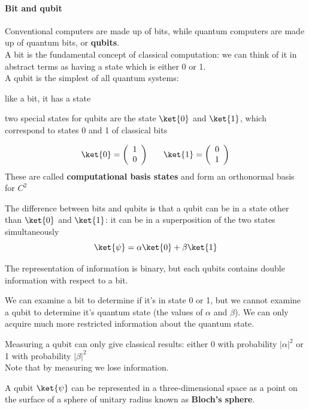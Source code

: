 \documentclass[10pt]{report}
\begin{document}
\paragraph{Bit and qubit} Conventional computers are made up of bits, while quantum computers are made up of quantum bits, or \textbf{qubits}.\\
A bit is the fundamental concept of classical computation: we can think of it in abstract terms as having a state which is either 0 or 1.\\
A qubit is the simplest of all quantum systems:
\begin{list}{}{}
	\item like a bit, it has a state
	\item two special states for qubits are the state $\ket{0}$ and $\ket{1}$, which correspond to states 0 and 1 of classical bits
	
$$\ket{0} = \left(\begin{array}{c}
	1\\0
	\end{array}\right)\:\:\:\:\:\:\:\:\ket{1} = \left(\begin{array}{c}
	0\\1
	\end{array}\right)$$
	These are called \textbf{computational basis states} and form an orthonormal basis for $C^2$
	\item The difference between bits and qubits is that a qubit can be in a state other than $\ket{0}$ and $\ket{1}$: it can be in a superposition of the two states simultaneously
	$$\ket{\psi} = \alpha\ket{0}+\beta\ket{1}$$
	\item The representation of information is binary, but each qubits contains double information with respect to a bit.
	\item We can examine a bit to determine if it's in state 0 or 1, but we cannot examine a qubit to determine it's quantum state (the values of $\alpha$ and $\beta$). We can only acquire much more restricted information about the quantum state.
	\item Measuring a qubit can only give classical results: either 0 with probability $|\alpha|^2$ or 1 with probability $|\beta|^2$\\
	Note that by measuring we lose information.
	\item A qubit $\ket{\psi}$ can be represented in a three-dimensional space as a point on the surface of a sphere of unitary radius known as \textbf{Bloch's sphere}.
\end{list}
\end{document}
